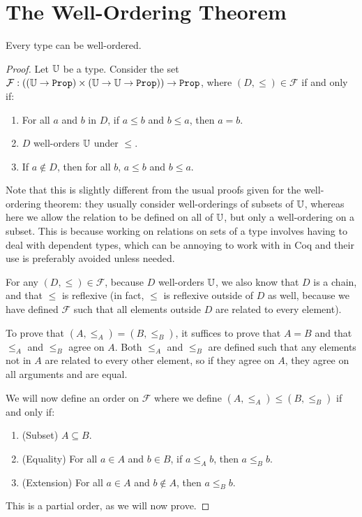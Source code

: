 \documentclass[../../math.tex]{subfiles}
\begin{document}
\section{The Well-Ordering Theorem}

\begin{theorem}
    Every type can be well-ordered.
\end{theorem}
\begin{proof}
    Let $\mathbb{U}$ be a type.  Consider the set $\mathcal F : ((\U \to \Prop) \times
    (\U \to \U \to \Prop)) \to \Prop$, where $(D, \leq) \in \mathcal F$ if and
    only if:
    \begin{enumerate}
        \item For all $a$ and $b$ in $D$, if $a \leq b$ and $b \leq a$, then $a
        = b$.
        \item $D$ well-orders $\mathbb{U}$ under $\leq$.
        \item If $a \notin D$, then for all $b$, $a \leq b$ and $b \leq a$.
    \end{enumerate}
    Note that this is slightly different from the usual proofs given for the
    well-ordering theorem: they usually consider well-orderings of subsets of
    $\mathbb{U}$, whereas here we allow the relation to be defined on all of $\mathbb{U}$, but
    only a well-ordering on a subset.  This is because working on relations on
    sets of a type involves having to deal with dependent types, which can be
    annoying to work with in Coq and their use is preferably avoided unless
    needed.

    For any $(D, \leq) \in \mathcal F$, because $D$ well-orders $\mathbb{U}$, we also
    know that $D$ is a chain, and that $\leq$ is reflexive (in fact, $\leq$ is
    reflexive outside of $D$ as well, because we have defined $\mathcal F$ such
    that all elements outside $D$ are related to every element).

    To prove that $(A, \leq_A) = (B, \leq_B)$, it suffices to prove that $A = B$
    and that $\leq_A$ and $\leq_B$ agree on $A$.  Both $\leq_A$ and $\leq_B$ are
    defined such that any elements not in $A$ are related to every other
    element, so if they agree on $A$, they agree on all arguments and are equal.

    We will now define an order on $\mathcal F$ where we define $(A, \leq_A)
    \leq (B, \leq_B)$ if and only if:
    \begin{enumerate}
        \item (Subset) $A \subseteq B$.
        \item (Equality) For all $a \in A$ and $b \in B$, if $a \leq_A b$, then
        $a \leq_B b$.
        \item (Extension) For all $a \in A$ and $b \notin A$, then $a \leq_B b$.
    \end{enumerate}
    This is a partial order, as we will now prove.


\end{proof}
\end{document}
